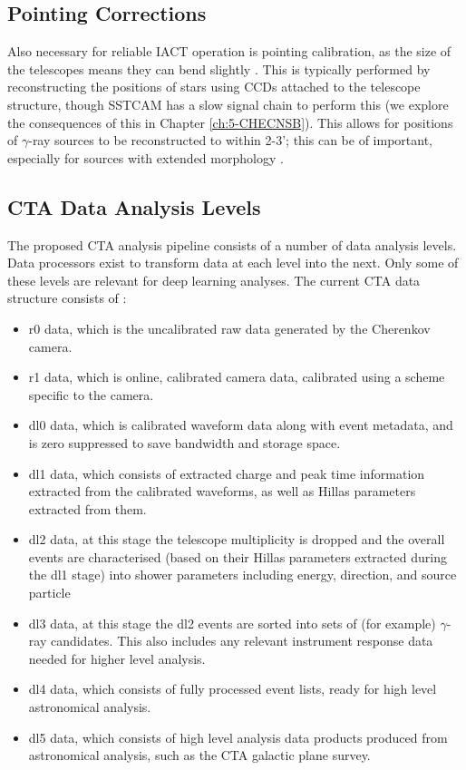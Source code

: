 \subsection{Pointing Corrections}
Also necessary for reliable IACT operation is pointing calibration, as the size of the telescopes means they can bend slightly \cite{veritasstat}. This is typically performed by reconstructing the positions of stars using CCDs attached to the telescope structure, though SSTCAM has a slow signal chain to perform this (we explore the consequences of this in Chapter \ref{ch:5-CHECNSB}). This allows for positions of $\gamma$-ray sources to be reconstructed to within 2-3'; this can be of important, especially for sources with extended morphology \cite{cena} \cite{rxjcta}.

\subsection{CTA Data Analysis Levels}

The proposed CTA analysis pipeline consists of a number of data analysis levels. Data processors exist to transform data at each level into the next. Only some of these levels are relevant for deep learning analyses. The current CTA data structure consists of \cite{jasonthesis}:
\begin{itemize}
    \item r0 data, which is the uncalibrated raw data generated by the Cherenkov camera.
    \item r1 data, which is online, calibrated camera data, calibrated using a scheme specific to the camera.
    \item dl0 data, which is calibrated waveform data along with event metadata, and is zero suppressed to save bandwidth and storage space.
    \item dl1 data, which consists of extracted charge and peak time information extracted from the calibrated waveforms, as well as Hillas parameters extracted from them.
    \item dl2 data, at this stage the telescope multiplicity is dropped and the overall events are characterised (based on their Hillas parameters extracted during the dl1 stage) into shower parameters including energy, direction, and source particle
    \item dl3 data, at this stage the dl2 events are sorted into sets of (for example) $\gamma$-ray candidates. This also includes any relevant instrument response data needed for higher level analysis.
    \item dl4 data, which consists of fully processed event lists, ready for high level astronomical analysis.
    \item dl5 data, which consists of high level analysis data products produced from astronomical analysis, such as the CTA galactic plane survey.
\end{itemize}


